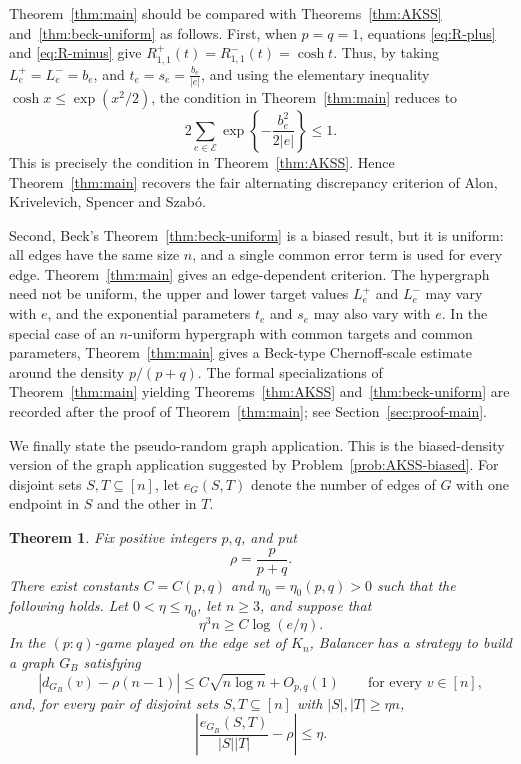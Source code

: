 \documentclass[twoside,12pt]{article}
\numberwithin{equation}{section}
\newtheorem{theorem}{Theorem}[section]
\begin{document}
Theorem~\ref{thm:main} should be compared with Theorems~\ref{thm:AKSS}
and~\ref{thm:beck-uniform} as follows. First, when $p=q=1$, equations
\eqref{eq:R-plus} and \eqref{eq:R-minus} give $R^+_{1,1}(t)=R^-_{1,1}(t)=\cosh t$.
Thus, by taking
        $L_e^+=L_e^-=b_e$,
        and 
        $t_e=s_e=\frac{b_e}{|e|}$,
and using the elementary inequality $\cosh x\le \exp(x^2/2)$, the condition
in Theorem~\ref{thm:main} reduces to
\[
        2\sum_{e\in\mathcal E}
        \exp\!\left\{-\frac{b_e^2}{2|e|}\right\}
        \le 1.
\]
This is precisely the condition in Theorem~\ref{thm:AKSS}. Hence
Theorem~\ref{thm:main} recovers the fair alternating discrepancy criterion
of Alon, Krivelevich, Spencer and Szab\'o.

Second, Beck's Theorem~\ref{thm:beck-uniform} is a biased result, but it is
uniform: all edges have the same size $n$, and a single common error term is
used for every edge.  Theorem~\ref{thm:main} gives an edge-dependent
criterion. The hypergraph need not be uniform, the upper and lower target
values $L_e^+$ and $L_e^-$ may vary with $e$, and the exponential parameters
$t_e$ and $s_e$ may also vary with $e$. In the special case of an
$n$-uniform hypergraph with common targets and common parameters,
Theorem~\ref{thm:main} gives a Beck-type Chernoff-scale estimate around the
density $p/(p+q)$. 
The formal specializations of Theorem~\ref{thm:main} yielding
Theorems~\ref{thm:AKSS} and~\ref{thm:beck-uniform} are recorded after the
proof of Theorem~\ref{thm:main}; see Section~\ref{sec:proof-main}. 

We finally state the pseudo-random graph application. This is the
biased-density version of the graph application suggested by
Problem~\ref{prob:AKSS-biased}.  For disjoint sets $S,T\subseteq[n]$, let
$e_G(S,T)$ denote the number of edges of $G$ with one endpoint in $S$ and the
other in $T$.

\begin{theorem}\label{thm:pseudorandom}
Fix positive integers $p,q$, and put
\[
        \rho=\frac{p}{p+q}.
\]
There exist constants $C=C(p,q)$ and $\eta_0=\eta_0(p,q)>0$ such that the
following holds. Let $0<\eta\le\eta_0$, let $n\ge3$, and suppose that
\[
        \eta^3 n\ge C\log(e/\eta).
\]
In the $(p:q)$-game played on the edge set of $K_n$, Balancer has a strategy
to build a graph $G_B$ satisfying
\[
        \left|d_{G_B}(v)-\rho(n-1)\right|
        \le
        C\sqrt{n\log n}+O_{p,q}(1)
        \qquad\text{for every }v\in[n],
\]
and, for every pair of disjoint sets $S,T\subseteq[n]$ with
$|S|,|T|\ge\eta n$,
\[
        \left|
        \frac{e_{G_B}(S,T)}{|S||T|}-\rho
        \right|
        \le \eta .
\]
\end{theorem}
\end{document}
